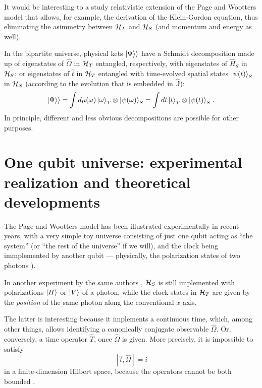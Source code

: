 It would be interesting to a study relativistic extension of the
Page and Wootters model that allows, for example, the derivation of the Klein-Gordon
equation, thus eliminating the asimmetry between
$\mathcal{H}_T$ and $\mathcal{H}_S$ (and momentum and energy as well).

In the bipartite universe, physical kets $|\Psi\rangle\rangle$ have a Schmidt decomposition
made up of
eigenstates of $\hat{\Omega}$ in $\mathcal{H}_T$
entangled, respectively, with
eigenstates of $\hat{H}_S$ in $\mathcal{H}_S$;
or eigenstates of $\hat{t}$ in $\mathcal{H}_T$
entangled with time-evolved spatial states $\ket{\psi(t)}_S$ in $\mathcal{H}_S$
(according to the evolution that is embedded in $\hat{\mathbb{J}}$):
\begin{equation}
  |\Psi\rangle\rangle = \int d\mu(\omega) \ket{\omega}_{T}\otimes\ket{\psi(\omega)}_{S} = \int dt \ket{t}_{T} \otimes \ket{\psi(t)}_{S}\,\text{.} 
\end{equation}
In principle, different and less obvious decompositions are possible for other purposes.

\section[
  One qubit universe \dots
]{One qubit universe: experimental realization and theoretical developments}

The Page and Wootters model has been illustrated experimentally in recent years,
with a very simple toy universe consisting of just one qubit acting as ``the system'' (or
``the rest of the universe'' if we will), and the clock being immplemented by another qubit ---
physically, the polarization states of two photons \parencite{Moreva:synthetic,Moreva:illustration}).

In another experiment by the same authors \parencite{Moreva_position}, $\mathcal{H}_S$ is still implemented with 
polarizations $\ket{H}$ or $\ket{V}$ of a photon, while the clock states in $\mathcal{H}_T$
are given by the \emph{position} of the same photon along the conventional $x$ axis.

The latter is interesting because it implements a continuous time,
which, among other things, allows identifying a canonically conjugate observable
$\hat{\Omega}$. Or, conversely, a time operator $\hat{T}$, once $\hat{\Omega}$ is given.
More precisely, it is impossible to satisfy
\begin{equation}\label{eq:canonical_commutation_in_time}
  [\hat{t}, \hat{\Omega}] = i
\end{equation}
in a finite-dimension Hilbert space, because the operators
cannot be both bounded \parencite{Weyl1927}.

